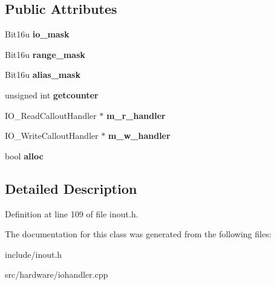 \subsection*{Public Attributes}
\begin{DoxyCompactItemize}
\item 
\hypertarget{classIO__CalloutObject_a5ae148d6c5bc87e8923b556d38530eb4}{Bit16u {\bfseries io\-\_\-mask}}\label{classIO__CalloutObject_a5ae148d6c5bc87e8923b556d38530eb4}

\item 
\hypertarget{classIO__CalloutObject_a8b820c98cb5ad379c2d6dd856cf219d8}{Bit16u {\bfseries range\-\_\-mask}}\label{classIO__CalloutObject_a8b820c98cb5ad379c2d6dd856cf219d8}

\item 
\hypertarget{classIO__CalloutObject_a65b61522259efdf57e0cd64f3624647c}{Bit16u {\bfseries alias\-\_\-mask}}\label{classIO__CalloutObject_a65b61522259efdf57e0cd64f3624647c}

\item 
\hypertarget{classIO__CalloutObject_a95f1864767f4afa68249ed9dbf5b8585}{unsigned int {\bfseries getcounter}}\label{classIO__CalloutObject_a95f1864767f4afa68249ed9dbf5b8585}

\item 
\hypertarget{classIO__CalloutObject_a630150d967b794733d134236e3cb4adf}{I\-O\-\_\-\-Read\-Callout\-Handler $\ast$ {\bfseries m\-\_\-r\-\_\-handler}}\label{classIO__CalloutObject_a630150d967b794733d134236e3cb4adf}

\item 
\hypertarget{classIO__CalloutObject_a99b204ed0c61306168713e862e64d779}{I\-O\-\_\-\-Write\-Callout\-Handler $\ast$ {\bfseries m\-\_\-w\-\_\-handler}}\label{classIO__CalloutObject_a99b204ed0c61306168713e862e64d779}

\item 
\hypertarget{classIO__CalloutObject_ac5829f78cf89ab96657e3fcc8b4b6da0}{bool {\bfseries alloc}}\label{classIO__CalloutObject_ac5829f78cf89ab96657e3fcc8b4b6da0}

\end{DoxyCompactItemize}


\subsection{Detailed Description}


Definition at line 109 of file inout.\-h.



The documentation for this class was generated from the following files\-:\begin{DoxyCompactItemize}
\item 
include/inout.\-h\item 
src/hardware/iohandler.\-cpp\end{DoxyCompactItemize}

